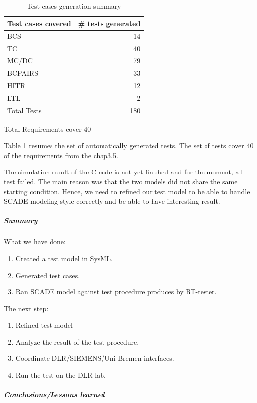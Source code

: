 \begin{table}[htbp]
\centering
\begin{tabular}{lr}\toprule
  Test cases covered & \# tests generated  \\\midrule
  BCS & 14 \\
  TC & 40 \\
  MC/DC & 79 \\
  BCPAIRS & 33\\
  HITR & 12 \\
  LTL & 2 \\ \midrule
  Total Tests& 180\\\bottomrule
\end{tabular}

\vspace{1em}
\raggedleft Total Requirements cover 40
\caption{\label{tbl:test_summary} Test cases generation summary}
\end{table}

Table \ref{tbl:test_summary} resumes the set of automatically
generated tests.
The set of tests cover 40 of the requirements from the chap3.5.


The simulation result of the C code is not yet finished and for the
moment, all test failed. The main reason was that the two
models did not share the same starting condition.
Hence, we  need to refined our test model to be able to handle SCADE
modeling style correctly and be able to have interesting result.



\subparagraph{Summary}

What we have done:
\begin{enumerate}
\item Created a test model in SysML.
\item Generated test cases.
\item Ran SCADE model against test procedure produces by RT-tester.
\end{enumerate}
 
 The next step:
 \begin{enumerate}
 \item Refined test model
 \item Analyze the result of the test procedure.
 \item Coordinate DLR/SIEMENS/Uni Bremen interfaces.
 \item Run the test on the DLR lab.
 \end{enumerate}

\subparagraph{Conclusions/Lessons learned}

